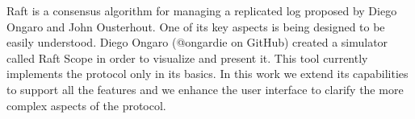 Raft is a consensus algorithm for managing a replicated log proposed by Diego Ongaro and John Ousterhout.
One of its key aspects is being designed to be easily understood.
Diego Ongaro (@ongardie on GitHub) created a simulator called Raft Scope in order to visualize
and present it.
This tool currently implements the protocol only in its basics.
In this work we extend its capabilities to support all the features
and we enhance the user interface to clarify the more complex aspects of the protocol.
